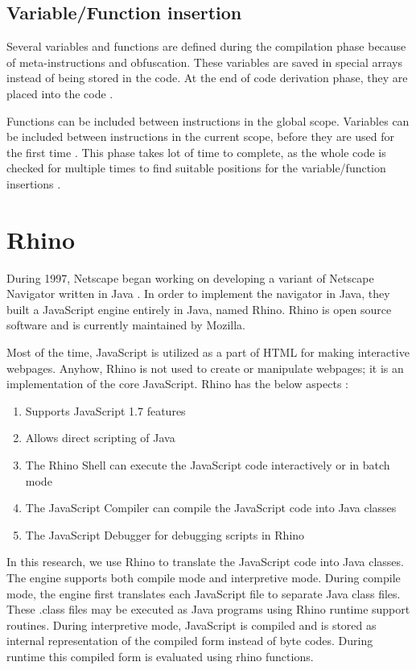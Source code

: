 \subsection{Variable/Function insertion}

Several variables and functions are defined during the compilation phase because of meta-instructions and obfuscation. These variables are saved in special arrays instead of being stored in the code. At the end of code derivation phase, they are placed into the code .

Functions can be included between instructions in the global scope. Variables can be included between instructions in the current scope, before they are used for the first time \cite{bib4}. This phase takes lot of time to complete, as the whole code is checked for multiple times to find suitable positions for the variable/function insertions \cite{bib26}.


\section{Rhino}

During 1997, Netscape began working on developing a variant of Netscape Navigator written in Java \cite{bib27}. In order to implement the navigator in Java, they built a JavaScript engine entirely in Java, named Rhino. Rhino is open source software and is currently maintained by Mozilla.

Most of the time, JavaScript is utilized as a part of HTML for making interactive webpages. Anyhow, Rhino is not used to create or manipulate webpages; it is an implementation of the core JavaScript. Rhino has the below aspects \cite{bib27}:

\begin{enumerate}
\item Supports JavaScript 1.7 features
\item Allows direct scripting of Java
\item The Rhino Shell can execute the JavaScript code interactively or in batch mode
\item The JavaScript Compiler can compile the JavaScript code into Java classes
\item The JavaScript Debugger for debugging scripts in Rhino
\end{enumerate}
 
In this research, we use Rhino to translate the JavaScript code into Java classes. The engine supports both compile mode and interpretive mode. During compile mode, the engine first translates each JavaScript file to separate Java class files. These .class files may be executed as Java programs using Rhino runtime support routines. During interpretive mode, JavaScript is compiled and is stored as internal representation of the compiled form instead of byte codes. During runtime this compiled form is evaluated using rhino functions.

